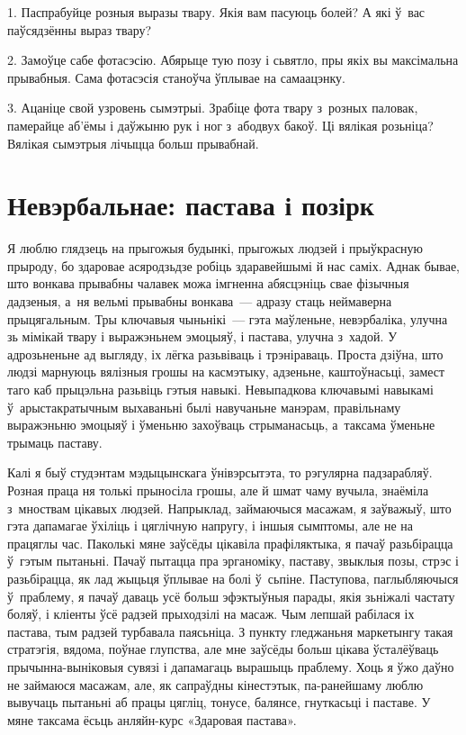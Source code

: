 1. Паспрабуйце розныя выразы твару. Якія вам пасуюць болей? А які ў~вас паўсядзённы выраз твару?

2. Замоўце сабе фотасэсію. Абярыце тую позу і сьвятло, пры якіх вы максімальна прывабныя. Сама фотасэсія станоўча ўплывае на самаацэнку.

3. Ацаніце свой узровень сымэтрыі. Зрабіце фота твару з~розных паловак, памерайце аб'ёмы і даўжыню рук і ног з~абодвух бакоў. Ці вялікая розьніца? Вялікая сымэтрыя лічыцца больш прывабнай.


\section{Невэрбальнае: пастава і позірк}

Я люблю глядзець на прыгожыя будынкі, прыгожых людзей і прыўкрасную прыроду, бо здаровае асяродзьдзе робіць здаравейшымі й нас саміх. Аднак бывае, што вонкава прывабны чалавек можа імгненна абясцэніць свае фізычныя дадзеныя, а~ня вельмі прывабны вонкава~--- адразу стаць неймаверна прыцягальным. Тры ключавыя чыньнікі~--- гэта маўленьне, невэрбаліка, улучна зь мімікай твару і выражэньнем эмоцыяў, і пастава, улучна з~хадой. У адрозьненьне ад выгляду, іх лёгка разьвіваць і трэніраваць. Проста дзіўна, што людзі марнуюць вялізныя грошы на касмэтыку, адзеньне, каштоўнасьці, замест таго каб прыцэльна разьвіць гэтыя навыкі. Невыпадкова ключавымі навыкамі ў~арыстакратычным выхаваньні былі навучаньне манэрам, правільнаму выражэньню эмоцыяў і ўменьню захоўваць стрыманасьць, а~таксама ўменьне трымаць паставу.

Калі я быў студэнтам мэдыцынскага ўнівэрсытэта, то рэгулярна падзарабляў. Розная праца ня толькі прыносіла грошы, але й шмат чаму вучыла, знаёміла з~мноствам цікавых людзей. Напрыклад, займаючыся масажам, я заўважыў, што гэта дапамагае ўхіліць і цяглічную напругу, і іншыя сымптомы, але не на працяглы час. Паколькі мяне заўсёды цікавіла прафіляктыка, я пачаў разьбірацца ў~гэтым пытаньні. Пачаў пытацца пра эрганоміку, паставу, звыклыя позы, стрэс і разьбірацца, як лад жыцьця ўплывае на болі ў~сьпіне. Паступова, паглыбляючыся ў~праблему, я пачаў даваць усё больш эфэктыўныя парады, якія зьніжалі частату боляў, і кліенты ўсё радзей прыходзілі на масаж. Чым лепшай рабілася іх пастава, тым радзей турбавала паясьніца. З пункту гледжаньня маркетынгу такая стратэгія, вядома, поўнае глупства, але мне заўсёды больш цікава ўсталёўваць прычынна-выніковыя сувязі і дапамагаць вырашыць праблему. Хоць я ўжо даўно не займаюся масажам, але, як сапраўдны кінестэтык, па-ранейшаму люблю вывучаць пытаньні аб працы цягліц, тонусе, балянсе, гнуткасьці і паставе. У мяне таксама ёсьць анляйн-курс «Здаровая пастава».

